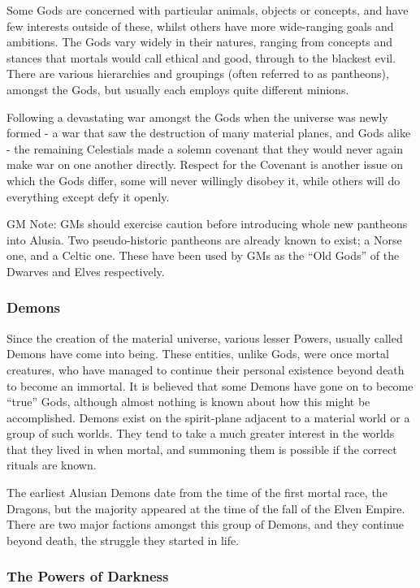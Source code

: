 Some Gods are concerned with particular animals, objects or concepts,
and have few interests outside of these, whilst others have more
wide-ranging goals and ambitions. The Gods vary widely in their
natures, ranging from concepts and stances that mortals would call
ethical and good, through to the blackest evil.  There are various
hierarchies and groupings (often referred to as pantheons), amongst
the Gods, but usually each employs quite different minions.

Following a devastating war amongst the Gods when the universe was
newly formed - a war that saw the destruction of many material planes,
and Gods alike - the remaining Celestials made a solemn covenant that
they would never again make war on one another directly.  Respect for
the Covenant is another issue on which the Gods differ, some will
never willingly disobey it, while others will do everything except
defy it openly.

GM Note: GMs should exercise caution before introducing whole new
pantheons into Alusia. Two pseudo-historic pantheons are already known
to exist; a Norse one, and a Celtic one. These have been used by GMs
as the ``Old Gods'' of the Dwarves and Elves respectively.


\subsubsection{Demons}

Since the creation of the material universe, various lesser Powers,
usually called Demons have come into being. These entities, unlike
Gods, were once mortal creatures, who have managed to continue their
personal existence beyond death to become an immortal. It is believed
that some Demons have gone on to become ``true'' Gods, although almost
nothing is known about how this might be accomplished. Demons exist on
the spirit-plane adjacent to a material world or a group of such
worlds. They tend to take a much greater interest in the worlds that
they lived in when mortal, and summoning them is possible if the
correct rituals are known.

The earliest Alusian Demons date from the time of the first mortal
race, the Dragons, but the majority appeared at the time of the fall
of the Elven Empire. There are two major factions amongst this group
of Demons, and they continue beyond death, the struggle they started
in life.

\subsubsection{The Powers of Darkness}


